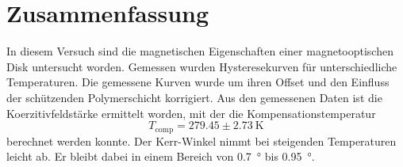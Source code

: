 \section{Zusammenfassung}
In diesem Versuch sind die magnetischen Eigenschaften einer magnetooptischen Disk untersucht worden. Gemessen wurden Hysteresekurven für unterschiedliche Temperaturen. Die gemessene Kurven wurde um ihren Offset und den Einfluss der schützenden Polymerschicht korrigiert. Aus den gemessenen Daten ist die Koerzitivfeldstärke ermittelt worden, mit der die Kompensationstemperatur 
\begin{equation}
T_\mathrm{comp}  = 279.45 \pm 2.73\ \mathrm{K} 
\end{equation}
berechnet werden konnte.
Der Kerr-Winkel nimmt bei steigenden Temperaturen leicht ab.
Er bleibt dabei in einem Bereich von \SI{0.7}{\degree} bis \SI{0.95}{\degree}.
